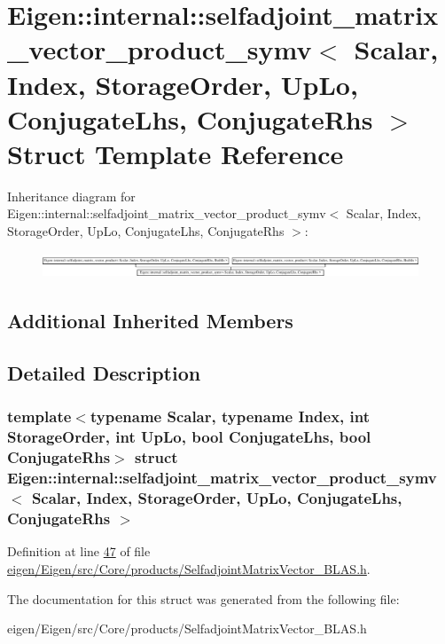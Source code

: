 \hypertarget{struct_eigen_1_1internal_1_1selfadjoint__matrix__vector__product__symv}{}\section{Eigen\+:\+:internal\+:\+:selfadjoint\+\_\+matrix\+\_\+vector\+\_\+product\+\_\+symv$<$ Scalar, Index, Storage\+Order, Up\+Lo, Conjugate\+Lhs, Conjugate\+Rhs $>$ Struct Template Reference}
\label{struct_eigen_1_1internal_1_1selfadjoint__matrix__vector__product__symv}
Inheritance diagram for Eigen\+:\+:internal\+:\+:selfadjoint\+\_\+matrix\+\_\+vector\+\_\+product\+\_\+symv$<$ Scalar, Index, Storage\+Order, Up\+Lo, Conjugate\+Lhs, Conjugate\+Rhs $>$\+:\begin{figure}[H]
\begin{center}
\leavevmode
\includegraphics[height=0.759837cm]{struct_eigen_1_1internal_1_1selfadjoint__matrix__vector__product__symv}
\end{center}
\end{figure}
\subsection*{Additional Inherited Members}


\subsection{Detailed Description}
\subsubsection*{template$<$typename Scalar, typename Index, int Storage\+Order, int Up\+Lo, bool Conjugate\+Lhs, bool Conjugate\+Rhs$>$\newline
struct Eigen\+::internal\+::selfadjoint\+\_\+matrix\+\_\+vector\+\_\+product\+\_\+symv$<$ Scalar, Index, Storage\+Order, Up\+Lo, Conjugate\+Lhs, Conjugate\+Rhs $>$}



Definition at line \hyperlink{eigen_2_eigen_2src_2_core_2products_2_selfadjoint_matrix_vector___b_l_a_s_8h_source_l00047}{47} of file \hyperlink{eigen_2_eigen_2src_2_core_2products_2_selfadjoint_matrix_vector___b_l_a_s_8h_source}{eigen/\+Eigen/src/\+Core/products/\+Selfadjoint\+Matrix\+Vector\+\_\+\+B\+L\+A\+S.\+h}.



The documentation for this struct was generated from the following file\+:\begin{DoxyCompactItemize}
\item 
eigen/\+Eigen/src/\+Core/products/\+Selfadjoint\+Matrix\+Vector\+\_\+\+B\+L\+A\+S.\+h\end{DoxyCompactItemize}
